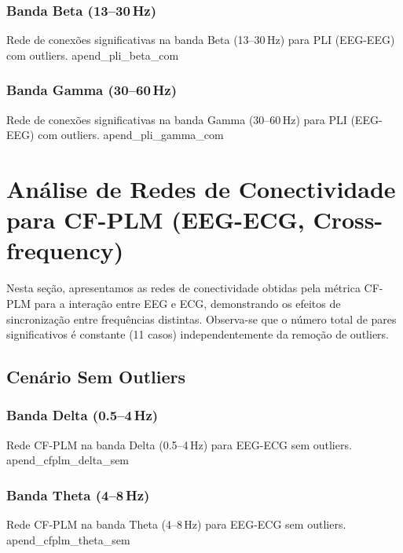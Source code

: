 \begin{apendicesenv}
  \subsection{Banda Beta (13--30\,Hz)}
  {Rede de conexões significativas na banda Beta (13--30\,Hz) para PLI (EEG-EEG) com outliers.}
  {apend_pli_beta_com}
  
  \subsection{Banda Gamma (30--60\,Hz)}
  {Rede de conexões significativas na banda Gamma (30--60\,Hz) para PLI (EEG-EEG) com outliers.}
  {apend_pli_gamma_com}
  
  \chapter{Análise de Redes de Conectividade para CF-PLM (EEG-ECG, Cross-frequency)}
  \label{apendice:cfplm_eeg_ecg}
  Nesta seção, apresentamos as redes de conectividade obtidas pela métrica CF-PLM para a interação entre EEG e ECG, demonstrando os efeitos de sincronização entre frequências distintas. Observa-se que o número total de pares significativos é constante (11 casos) independentemente da remoção de outliers.
  
  \section{Cenário Sem Outliers}
  
  \subsection{Banda Delta (0.5--4\,Hz)}
  {Rede CF-PLM na banda Delta (0.5--4\,Hz) para EEG-ECG sem outliers.}
  {apend_cfplm_delta_sem}
  
  \subsection{Banda Theta (4--8\,Hz)}
  {Rede CF-PLM na banda Theta (4--8\,Hz) para EEG-ECG sem outliers.}
  {apend_cfplm_theta_sem}
  

\end{apendicesenv}
